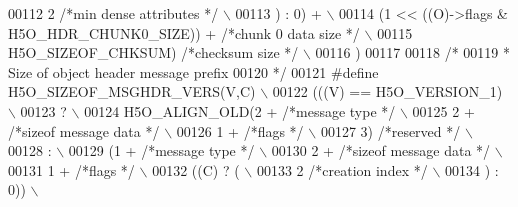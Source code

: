 \begin{DoxyCode}
00112 \textcolor{preprocessor}{                  2     }\textcolor{comment}{/*min dense attributes  */}\textcolor{preprocessor}{            \(\backslash\)}
00113 \textcolor{preprocessor}{                ) : 0) +                              \(\backslash\)}
00114 \textcolor{preprocessor}{                (1 << ((O)->flags & H5O\_HDR\_CHUNK0\_SIZE)) + }\textcolor{comment}{/*chunk 0 data size */}\textcolor{preprocessor}{ \(\backslash\)}
00115 \textcolor{preprocessor}{                H5O\_SIZEOF\_CHKSUM) }\textcolor{comment}{/*checksum size  */}\textcolor{preprocessor}{            \(\backslash\)}
00116 \textcolor{preprocessor}{    )}
00117 
00118 \textcolor{comment}{/*}
00119 \textcolor{comment}{ * Size of object header message prefix}
00120 \textcolor{comment}{ */}
00121 \textcolor{preprocessor}{#define H5O\_SIZEOF\_MSGHDR\_VERS(V,C)                       \(\backslash\)}
00122 \textcolor{preprocessor}{    (((V) == H5O\_VERSION\_1)                               \(\backslash\)}
00123 \textcolor{preprocessor}{        ?                                     \(\backslash\)}
00124 \textcolor{preprocessor}{            H5O\_ALIGN\_OLD(2 +   }\textcolor{comment}{/*message type      */}\textcolor{preprocessor}{            \(\backslash\)}
00125 \textcolor{preprocessor}{                2 +     }\textcolor{comment}{/*sizeof message data   */}\textcolor{preprocessor}{            \(\backslash\)}
00126 \textcolor{preprocessor}{                1 +     }\textcolor{comment}{/*flags                 */}\textcolor{preprocessor}{            \(\backslash\)}
00127 \textcolor{preprocessor}{                3)      }\textcolor{comment}{/*reserved      */}\textcolor{preprocessor}{            \(\backslash\)}
00128 \textcolor{preprocessor}{        :                                     \(\backslash\)}
00129 \textcolor{preprocessor}{            (1 +        }\textcolor{comment}{/*message type      */}\textcolor{preprocessor}{            \(\backslash\)}
00130 \textcolor{preprocessor}{                2 +         }\textcolor{comment}{/*sizeof message data   */}\textcolor{preprocessor}{            \(\backslash\)}
00131 \textcolor{preprocessor}{                1 +     }\textcolor{comment}{/*flags                 */}\textcolor{preprocessor}{            \(\backslash\)}
00132 \textcolor{preprocessor}{                ((C) ? (                              \(\backslash\)}
00133 \textcolor{preprocessor}{                  2     }\textcolor{comment}{/*creation index        */}\textcolor{preprocessor}{            \(\backslash\)}
00134 \textcolor{preprocessor}{                ) : 0))                               \(\backslash\)}

\end{DoxyCode}
